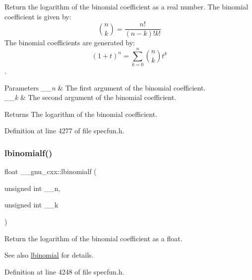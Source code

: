 Return the logarithm of the binomial coefficient as a real number. The binomial coefficient is given by\+: \[ \binom{n}{k} = \frac{n!}{(n-k)! k!} \] The binomial coefficients are generated by\+: \[ \left(1 + t\right)^n = \sum_{k=0}^n \binom{n}{k} t^k \]. 


\begin{DoxyParams}{Parameters}
{\em \+\_\+\+\_\+n} & The first argument of the binomial coefficient. \\
\hline
{\em \+\_\+\+\_\+k} & The second argument of the binomial coefficient. \\
\hline
\end{DoxyParams}
\begin{DoxyReturn}{Returns}
The logarithm of the binomial coefficient. 
\end{DoxyReturn}


Definition at line 4277 of file specfun.\+h.

\mbox{\label{group__gnu__math__spec__func_ga2fe55bab4211fb240e1eb01341914129}} 
\subsubsection{\texorpdfstring{lbinomialf()}{lbinomialf()}}
{\footnotesize\ttfamily float \+\_\+\+\_\+gnu\+\_\+cxx\+::lbinomialf (\begin{DoxyParamCaption}\item[{unsigned int}]{\+\_\+\+\_\+n,  }\item[{unsigned int}]{\+\_\+\+\_\+k }\end{DoxyParamCaption})\hspace{0.3cm}{\ttfamily [inline]}}

Return the logarithm of the binomial coefficient as a {\ttfamily float}.

\begin{DoxySeeAlso}{See also}
\hyperlink{group__gnu__math__spec__func_gabfa5aeba56edfa110846fc8e76963bc2}{lbinomial} for details. 
\end{DoxySeeAlso}


Definition at line 4248 of file specfun.\+h.

\mbox{\label{group__gnu__math__spec__func_ga20e6c250e10e20b9e2c3f68bf9a3d4c1}} 
